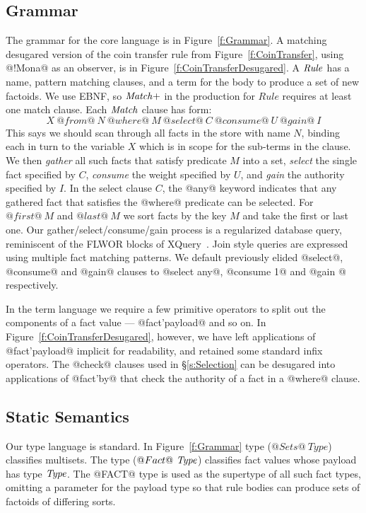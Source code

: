 \subsection{Grammar}
The grammar for the core language is in Figure~\ref{f:Grammar}. A matching desugared version of the coin transfer rule from Figure~\ref{f:CoinTransfer}, using @!Mona@ as an observer, is in Figure~\ref{f:CoinTransferDesugared}.
A $\mathit{Rule}$ has a name, pattern matching clauses, and a term for the body to produce a set of new factoids. We use EBNF, so $\mathit{Match}+$ in the production for $Rule$ requires at least one match clause. Each $\mathit{Match}$ clause has form:
$$
X~ @from@~ N~ @where@~ M~ @select@~ C~ @consume@~ U~ @gain@~ I
$$
This says we should scan through all facts in the store with name $N$, binding each in turn to the variable $X$ which is in scope for the sub-terms in the clause. We then \emph{gather} all such facts that satisfy predicate $M$ into a set, \emph{select} the single fact specified by $C$, \emph{consume} the weight specified by $U$, and \emph{gain} the authority specified by $I$. In the select clause $C$, the @any@ keyword indicates that any gathered fact that satisfies the @where@ predicate can be selected. For $@first@~ M$ and $@last@~ M$ we sort facts by the key $M$ and take the first or last one. Our gather/select/consume/gain process is a regularized database query, reminiscent of the FLWOR blocks of XQuery~\cite{Boag2002:XQuery}. Join style queries are expressed using multiple fact matching patterns. We default previously elided @select@, @consume@ and @gain@ clauses to @select any@, @consume 1@ and @gain {}@ respectively.

In the term language we require a few primitive operators to split out the components of a fact value --- @fact'payload@ and so on. In Figure~\ref{f:CoinTransferDesugared}, however, we have left applications of @fact'payload@ implicit for readability, and retained some standard infix operators. The @check@ clauses used in \S\ref{s:Selection} can be desugared into applications of @fact'by@ that check the authority of a fact in a @where@ clause.


\eject{}
\subsection{Static Semantics}
Our type language is standard. In Figure~\ref{f:Grammar} type ($@Sets@~ Type$) classifies multisets. The type ($@Fact@~ \mathit{Type}$) classifies fact values whose payload has type $\mathit{Type}$. The @FACT@ type is used as the supertype of all such fact types, omitting a parameter for the payload type so that rule bodies can produce sets of factoids of differing sorts.

